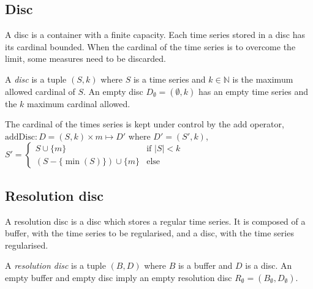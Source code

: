 \subsection{Disc}\label{sec:model:disc}

A disc is a container with a finite capacity. Each time series stored
in a disc has its cardinal bounded. When the cardinal of the time
series is to overcome the limit, some measures need to be discarded.

\begin{definition}[Disc]
  A \emph{disc} is a tuple $(S,k)$ where $S$ is a time series and
  $k\in\mathbb{N}$ is the maximum allowed cardinal of $S$.  An empty
  disc $D_{\emptyset} = (\emptyset,k)$ has an empty time series and
  the $k$ maximum cardinal allowed.
\end{definition}


The cardinal of the times series is kept under control by the add
operator,
 $\text{addDisc}: D=(S,k) \times m \mapsto D'$ where $ D' =
(S',k)$, $ S' =
  \begin{cases}
      S\cup\{m\} &\text{if }  |S|<k\\
      (S-\{\min(S)\}) \cup \{m\} & \text{else }
    \end{cases}  
    $



\subsection{Resolution disc}

A resolution disc is a disc which stores a regular time series. It is
composed of a buffer, with the time series to be regularised, and a
disc, with the time series regularised.

\begin{definition}
  A \emph{resolution disc} is a tuple $(B,D)$ where $B$ is a buffer
  and $D$ is a disc.  An empty buffer and empty disc imply an empty
  resolution disc $R_{\emptyset} = (B_{\emptyset},D_{\emptyset})$.
\end{definition}
 
